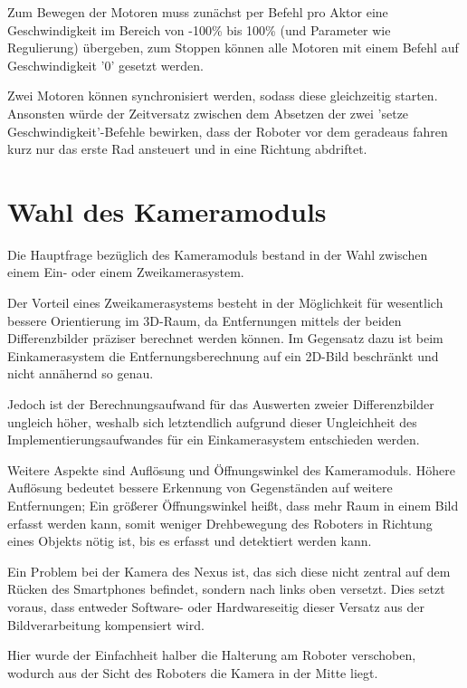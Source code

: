 Zum Bewegen der Motoren muss zunächst per Befehl pro Aktor eine Geschwindigkeit im Bereich von -100\% bis 100\% (und Parameter wie Regulierung) übergeben, zum Stoppen können alle Motoren mit einem Befehl auf Geschwindigkeit '0' gesetzt werden.

Zwei Motoren können synchronisiert werden, sodass diese gleichzeitig starten. Ansonsten würde der Zeitversatz zwischen dem Absetzen der zwei 'setze Geschwindigkeit'-Befehle bewirken, dass der Roboter vor dem geradeaus fahren kurz nur das erste Rad ansteuert und in eine Richtung abdriftet.

\section{Wahl des Kameramoduls}
\label{sec:Kamera}

Die Hauptfrage bezüglich des Kameramoduls bestand in der Wahl zwischen einem Ein- oder einem Zweikamerasystem.

Der Vorteil eines Zweikamerasystems besteht in der Möglichkeit für wesentlich bessere Orientierung im 3D-Raum, da Entfernungen mittels der beiden Differenzbilder präziser berechnet werden können.
Im Gegensatz dazu ist beim Einkamerasystem die Entfernungsberechnung auf ein 2D-Bild beschränkt und nicht annähernd so genau.

Jedoch ist der Berechnungsaufwand für das Auswerten zweier Differenzbilder ungleich höher, weshalb sich letztendlich aufgrund dieser Ungleichheit des Implementierungsaufwandes für ein Einkamerasystem entschieden werden.

Weitere Aspekte sind Auflösung und Öffnungswinkel des Kameramoduls.
Höhere Auflösung bedeutet bessere Erkennung von Gegenständen auf weitere Entfernungen; Ein größerer Öffnungswinkel heißt, dass mehr Raum in einem Bild erfasst werden kann, somit weniger Drehbewegung des Roboters in Richtung eines Objekts nötig ist, bis es erfasst und detektiert werden kann.

Ein Problem bei der Kamera des Nexus ist, das sich diese nicht zentral auf dem Rücken des Smartphones befindet, sondern nach links oben versetzt. Dies setzt voraus, dass entweder Software- oder Hardwareseitig dieser Versatz aus der Bildverarbeitung kompensiert wird.

Hier wurde der Einfachheit halber die Halterung am Roboter verschoben, wodurch aus der Sicht des Roboters die Kamera in der Mitte liegt.

